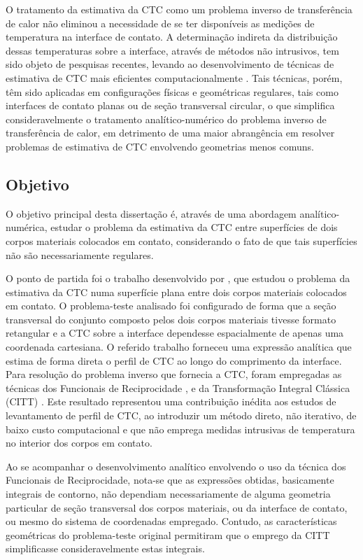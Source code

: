 O tratamento da estimativa da CTC como um problema inverso de transferência de calor não eliminou a necessidade de se ter disponíveis as medições de
temperatura na interface de contato. A determinação indireta da distribuição dessas temperaturas sobre a interface, através de métodos não intrusivos,
tem sido objeto de pesquisas recentes, levando ao desenvolvimento de técnicas de estimativa de CTC mais eficientes computacionalmente
\citep{artigo_colaco_1, artigo_colaco_2, artigo_colaco_3, artigo_colaco_4, artigo_padilha_3}. Tais técnicas, porém, têm sido aplicadas em configurações
físicas e geométricas regulares, tais como interfaces de contato planas ou de seção transversal circular, o que simplifica consideravelmente o tratamento
analítico-numérico do problema inverso de transferência de calor, em detrimento de uma maior abrangência em resolver problemas de estimativa de CTC
envolvendo geometrias menos comuns.

\subsection{Objetivo}

O objetivo principal desta dissertação é, através de uma abordagem analítico-numérica, estudar o problema da estimativa da CTC entre superfícies
de dois corpos materiais colocados em contato, considerando o fato de que tais superfícies não são necessariamente regulares.  

O ponto de partida foi o trabalho desenvolvido por \cite{tese_padilha}, que estudou o problema da estimativa da CTC numa superfície
plana entre dois corpos materiais colocados em contato. O problema-teste analisado foi configurado de forma que a seção transversal do
conjunto composto pelos dois
corpos materiais tivesse formato retangular e a CTC sobre a interface dependesse
espacialmente de apenas uma coordenada cartesiana. O referido trabalho forneceu uma expressão analítica que estima de forma direta
o perfil de CTC ao longo do comprimento da interface. Para resolução do problema inverso que fornecia a CTC, foram empregadas as técnicas dos Funcionais de Reciprocidade \citep{artigo_andrieux},
e da Transformação Integral Clássica (CITT) \citep{livro_cotta}. Este resultado representou uma contribuição inédita aos estudos de levantamento de perfil de CTC,
ao introduzir um método direto, não iterativo, de baixo custo computacional e que não emprega medidas intrusivas de temperatura no interior dos corpos em contato.

Ao se acompanhar o desenvolvimento analítico envolvendo o uso da técnica dos Funcionais de Reciprocidade, nota-se que as expressões obtidas, basicamente integrais de contorno, não dependiam necessariamente de
alguma geometria particular de seção transversal dos corpos materiais, ou da interface de contato, ou mesmo do sistema de coordenadas empregado.
Contudo, as características geométricas do problema-teste original permitiram que o emprego da CITT simplificasse consideravelmente estas integrais.

